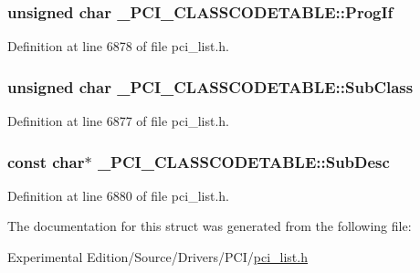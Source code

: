 \subsubsection[{\texorpdfstring{Prog\+If}{ProgIf}}]{\setlength{\rightskip}{0pt plus 5cm}unsigned char \+\_\+\+P\+C\+I\+\_\+\+C\+L\+A\+S\+S\+C\+O\+D\+E\+T\+A\+B\+L\+E\+::\+Prog\+If}\hypertarget{struct__PCI__CLASSCODETABLE_abc5ea223e3a634dfd00f40c5f3bede92}{}\label{struct__PCI__CLASSCODETABLE_abc5ea223e3a634dfd00f40c5f3bede92}


Definition at line 6878 of file pci\+\_\+list.\+h.

\subsubsection[{\texorpdfstring{Sub\+Class}{SubClass}}]{\setlength{\rightskip}{0pt plus 5cm}unsigned char \+\_\+\+P\+C\+I\+\_\+\+C\+L\+A\+S\+S\+C\+O\+D\+E\+T\+A\+B\+L\+E\+::\+Sub\+Class}\hypertarget{struct__PCI__CLASSCODETABLE_afefd8246fde2dfbce05dd0bd79f2bf28}{}\label{struct__PCI__CLASSCODETABLE_afefd8246fde2dfbce05dd0bd79f2bf28}


Definition at line 6877 of file pci\+\_\+list.\+h.

\subsubsection[{\texorpdfstring{Sub\+Desc}{SubDesc}}]{\setlength{\rightskip}{0pt plus 5cm}const char$\ast$ \+\_\+\+P\+C\+I\+\_\+\+C\+L\+A\+S\+S\+C\+O\+D\+E\+T\+A\+B\+L\+E\+::\+Sub\+Desc}\hypertarget{struct__PCI__CLASSCODETABLE_aeab4f5eb6b728b0401d4a75fd497309c}{}\label{struct__PCI__CLASSCODETABLE_aeab4f5eb6b728b0401d4a75fd497309c}


Definition at line 6880 of file pci\+\_\+list.\+h.



The documentation for this struct was generated from the following file\+:\begin{DoxyCompactItemize}
\item 
Experimental Edition/\+Source/\+Drivers/\+P\+C\+I/\hyperlink{pci__list_8h}{pci\+\_\+list.\+h}\end{DoxyCompactItemize}
